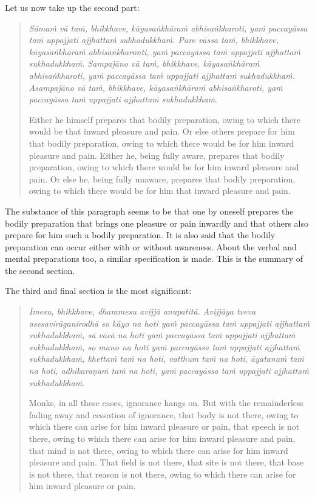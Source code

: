 Let us now take up the second part:

\begin{quote}
\emph{Sāmaṁ vā taṁ, bhikkhave, kāyasaṅkhāraṁ abhisaṅkharoti, yaṁ paccayāssa taṁ uppajjati ajjhattaṁ sukhadukkhaṁ. Pare vāssa taṁ, bhikkhave, kāyasaṅkhāraṁ abhisaṅkharonti, yaṁ paccayāssa taṁ uppajjati ajjhattaṁ sukhadukkhaṁ. Sampajāno vā taṁ, bhikkhave, kāyasaṅkhāraṁ abhisaṅkharoti, yaṁ paccayāssa taṁ uppajjati ajjhattaṁ sukhadukkhaṁ. Asampajāno vā taṁ, bhikkhave, kāyasaṅkhāraṁ abhisaṅkharoti, yaṁ paccayāssa taṁ uppajjati ajjhattaṁ sukhadukkhaṁ}.

Either he himself prepares that bodily preparation, owing to which there would be that inward pleasure and pain. Or else others prepare for him that bodily preparation, owing to which there would be for him inward pleasure and pain. Either he, being fully aware, prepares that bodily preparation, owing to which there would be for him inward pleasure and pain. Or else he, being fully unaware, prepares that bodily preparation, owing to which there would be for him that inward pleasure and pain.
\end{quote}

The substance of this paragraph seems to be that one by oneself prepares the bodily preparation that brings one pleasure or pain inwardly and that others also prepare for him such a bodily preparation. It is also said that the bodily preparation can occur either with or without awareness. About the verbal and mental preparations too, a similar specification is made. This is the summary of the second section.

The third and final section is the most significant:

\begin{quote}
\emph{Imesu, bhikkhave, dhammesu avijjā anupatitā. Avijjāya tveva asesavirāganirodhā so kāyo na hoti yaṁ paccayāssa taṁ uppajjati ajjhattaṁ sukhadukkhaṁ, sā vācā na hoti yaṁ paccayāssa taṁ uppajjati ajjhattaṁ sukhadukkhaṁ, so mano na hoti yaṁ paccayāssa taṁ uppajjati ajjhattaṁ sukhadukkhaṁ, khettaṁ taṁ na hoti, vatthum taṁ na hoti, āyatanaṁ taṁ na hoti, adhikaraṇaṁ taṁ na hoti, yaṁ paccayāssa taṁ uppajjati ajjhattaṁ sukhadukkhaṁ}.

Monks, in all these cases, ignorance hangs on. But with the remainderless fading away and cessation of ignorance, that body is not there, owing to which there can arise for him inward pleasure or pain, that speech is not there, owing to which there can arise for him inward pleasure and pain, that mind is not there, owing to which there can arise for him inward pleasure and pain. That field is not there, that site is not there, that base is not there, that reason is not there, owing to which there can arise for him inward pleasure or pain.
\end{quote}


